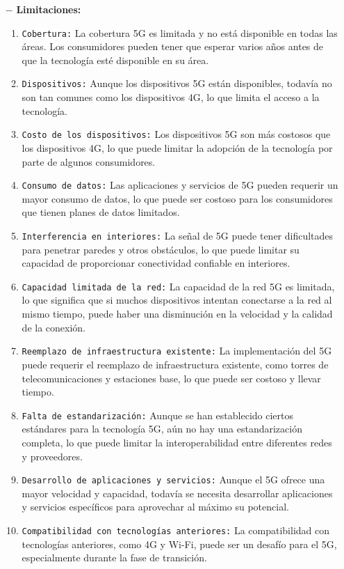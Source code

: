 \documentclass[12pt]{article}
\begin{document}
\begin{itemize}
\begin{enumerate}
                    \end{enumerate}
                    
                \item [$-$] \textbf{Limitaciones:}

                    \begin{enumerate}
                        \item {\tt  Cobertura:} La cobertura 5G es limitada y no está disponible en todas las áreas. Los consumidores pueden tener que esperar varios años antes de que la tecnología esté disponible en su área.
                        \item {\tt Dispositivos:}  Aunque los dispositivos 5G están disponibles, todavía no son tan comunes como los dispositivos 4G, lo que limita el acceso a la tecnología.
                        \item {\tt Costo de los dispositivos:}  Los dispositivos 5G son más costosos que los dispositivos 4G, lo que puede limitar la adopción de la tecnología por parte de algunos consumidores.
                        \item {\tt Consumo de datos:} Las aplicaciones y servicios de 5G pueden requerir un mayor consumo de datos, lo que puede ser costoso para los consumidores que tienen planes de datos limitados.
                        \item {\tt Interferencia en interiores:} La señal de 5G puede tener dificultades para penetrar paredes y otros obstáculos, lo que puede limitar su capacidad de proporcionar conectividad confiable en interiores.
                        \item {\tt Capacidad limitada de la red:} La capacidad de la red 5G es limitada, lo que significa que si muchos dispositivos intentan conectarse a la red al mismo tiempo, puede haber una disminución en la velocidad y la calidad de la conexión.
                        \item {\tt Reemplazo de infraestructura existente:} La implementación del 5G puede requerir el reemplazo de infraestructura existente, como torres de telecomunicaciones y estaciones base, lo que puede ser costoso y llevar tiempo.
                        \item {\tt Falta de estandarización:} Aunque se han establecido ciertos estándares para la tecnología 5G, aún no hay una estandarización completa, lo que puede limitar la interoperabilidad entre diferentes redes y proveedores.
                        \item {\tt Desarrollo de aplicaciones y servicios:} Aunque el 5G ofrece una mayor velocidad y capacidad, todavía se necesita desarrollar aplicaciones y servicios específicos para aprovechar al máximo su potencial.
                        \item {\tt Compatibilidad con tecnologías anteriores:} La compatibilidad con tecnologías anteriores, como 4G y Wi-Fi, puede ser un desafío para el 5G, especialmente durante la fase de transición.
                    \end{enumerate}
            \end{itemize}
\end{document}
